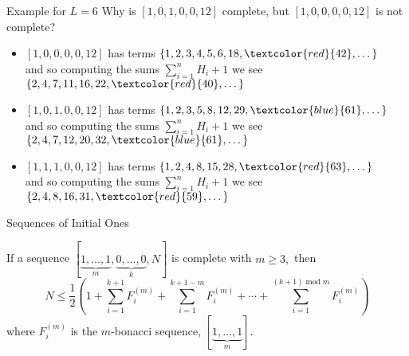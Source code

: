 \documentclass{beamer}
\DeclareMathOperator{\nsmod}{mod}
\newcommand{\nospacemod}[1]{\nsmod#1}
\begin{document}
\begin{frame}{Example for $L=6$}
Why is $[1,0,1,0,0,12]$ complete, but $[1,0,0,0,0,12]$ is not complete? \\
\begin{itemize}
\pause
\item $[1,0,0,0,0,12]$ has terms $\{1,2,3,4,5,6,18,\textcolor{red}{42},\dots \}$\\
         and so computing the sums $\sum_{i=1}^{n}H_i +1$ we see $\{2,4,7,11,16,22,\textcolor{red}{40},\dots \}$\\    
\pause
\item $[1,0,1,0,0,12]$ has terms $\{1,2,3,5,8,12,29,\textcolor{blue}{61},\dots \}$\\
         and so computing the sums $\sum_{i=1}^{n}H_i +1$ we see $\{2,4,7,12,20,32,\textcolor{blue}{61},\dots \}$\\
\pause
\item $[1,1,1,0,0,12]$ has terms $\{1, 2, 4, 8, 15, 28,\textcolor{red}{63},\dots \}$\\
         and so computing the sums $\sum_{i=1}^{n}H_i +1$ we see $\{2,4,8,16,31,\textcolor{red}{59},\dots \}$\\
\pause
\end{itemize}
\end{frame}
\begin{frame}{Sequences of Initial Ones}
\begin{theorem}[SMALL 2020]
If a sequence $[\underbrace{1,\ldots,1}_m,\underbrace{0,\ldots,0}_k,N]$ is complete with $m\geq 3,$ then
\[{N \leq \frac{1}{2} \left( 1 + \sum\limits_{i = 1}^{k + 1}F_i^{(m)} + \sum\limits_{i = 1}^{k + 1 - m}F^{(m)}_{i} + \cdots + \sum\limits_{i = 1}^{(k + 1)\nospacemod{m}}F^{(m)}_{i} \right)}\]
where $F_{i}^{(m)}$ is the $m$-bonacci sequence, $[\underbrace{1,\ldots,1}_m]$.
\end{theorem}
\end{frame}
\end{document}
